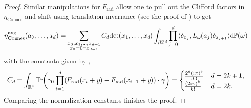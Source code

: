 \documentclass[12pt]{amsart}
\newcommand{\RM}{{\mathbb R}}
\newcommand{\ZM}{{\mathbb Z}}
\newcommand{\PM}{{\mathbb P}}
\newcommand{\Tr}{\mbox{\rm Tr}}
\newcommand{\difd}{\textup{d}}
\begin{document}
\begin{proof}
Similar manipulations for $F_{\mathrm{rad}}$ allow one to pull out the Clifford factors in $\eta_{\mathrm{Connes}}$ and shift using translation-invariance (see the proof of \cite[Theorem 6.3.1]{ProdanSchulzBaldes2016}) to get
\begin{align*}
\eta^{\mathrm{avg}}_{\mathrm{Connes}}(a_0,\dots,a_d) 
=\sum_{\substack{x_0,x_1,\dots,x_{d+1}\\ x_0=0=x_{d+1}}}  C_d \mathrm{det}(x_1,\dots,x_d)\int_{\beta\ZM^d}\prod_{j=0}^d\langle\delta_{x_j}, L_\omega(a_j)\delta_{x_{j+1}}\rangle\difd\PM(\omega) 
\end{align*}
with the constants given by \cite[Lemma~6.4.1]{ProdanSchulzBaldes2016}, 
$$C_d =\int_{\RM^d} \Tr\biggl(\gamma_0 \prod_{i=1}^d (F_{\mathrm{rad}}(x_{i}+y)- F_{\mathrm{rad}}(x_{i+1}+y))\cdot \gamma\biggr)=\begin{cases}
\frac{2^{d}(\imath \pi)^k}{d!!} & d=2k+1,\\
\frac{(2\imath \pi)^k}{k!} & d=2k.
\end{cases}$$
Comparing the normalization constants finishes the proof.
\end{proof}
\end{document}
